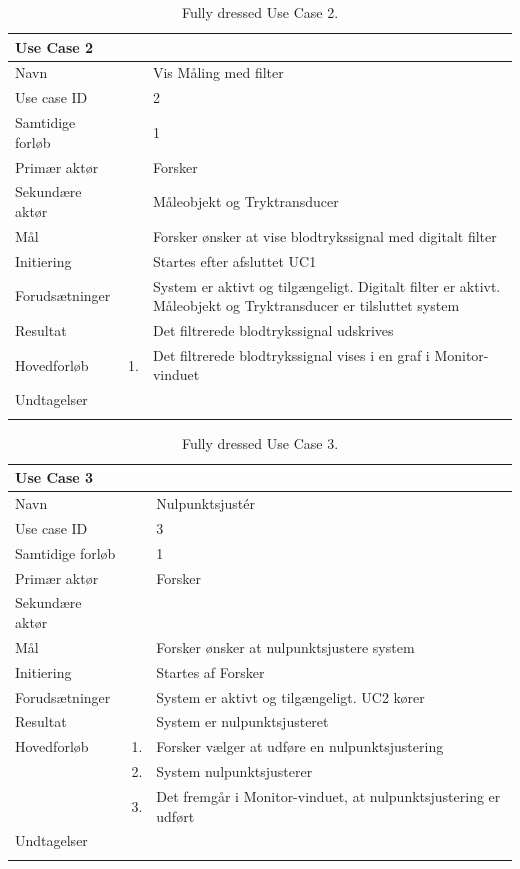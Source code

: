 \begin{longtabu} to  %
    {\large \textbf{Use Case 2}} && \\
    \toprule
    Navn &&    Vis Måling med filter\\
    Use case ID &&    2\\
    Samtidige forløb &&    1\\
    Primær aktør &&    Forsker\\
    Sekundære aktør &&	 Måleobjekt og Tryktransducer\\
    Mål &&    Forsker ønsker at vise blodtrykssignal med digitalt filter\\
    Initiering &&	Startes efter afsluttet UC1\\
    Forudsætninger &&  System er aktivt og tilgængeligt. Digitalt filter er aktivt. Måleobjekt og Tryktransducer er tilsluttet system\\
    Resultat &&		Det filtrerede blodtrykssignal udskrives                         \\ \midrule
    Hovedforløb &    1. &    Det filtrerede blodtrykssignal vises i en graf i Monitor-vinduet\newline\\ \midrule
                
    Undtagelser &    &   \\ \bottomrule
\caption{Fully dressed Use Case 2.}
\label{UC2}
\end{longtabu}


\begin{longtabu} to  %
    {\large \textbf{Use Case 3}} && \\
    \toprule
    Navn &&    Nulpunktsjustér\\
    Use case ID &&    3\\
    Samtidige forløb &&    1\\
    Primær aktør &&    Forsker\\
    Sekundære aktør && \\
    Mål &&    Forsker ønsker at nulpunktsjustere system\\
    Initiering &&	Startes af Forsker\\
    Forudsætninger &&  System er aktivt og tilgængeligt. UC2 kører \\    
    Resultat &&		System er nulpunktsjusteret\\ \midrule
    Hovedforløb &    1. &    Forsker vælger at udføre en nulpunktsjustering\\[-1ex]   						 	
                &    2. &    System nulpunktsjusterer\\[-1ex]
                &	 3.	&	 Det fremgår i Monitor-vinduet, at nulpunktsjustering er udført\newline\\ \midrule
                
    Undtagelser &     &      \\ \bottomrule
\caption{Fully dressed Use Case 3.}
\label{UC3}
\end{longtabu}

